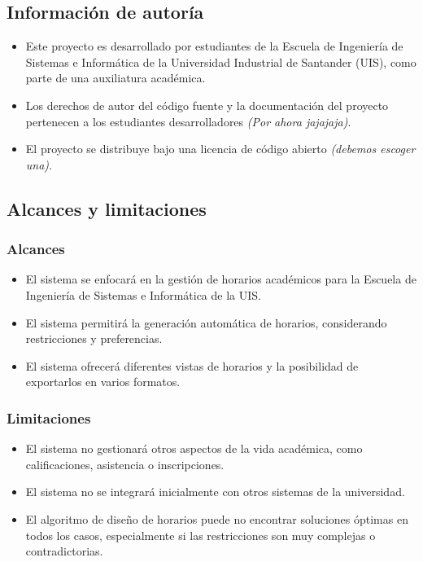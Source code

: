 \documentclass[12pt]{article} %
\begin{document}
\subsection{Información de autoría}
\begin{itemize}
    \item Este proyecto es desarrollado por estudiantes de la Escuela de Ingeniería de Sistemas e Informática de la Universidad Industrial de Santander (UIS), como parte de una auxiliatura académica.
    \item Los derechos de autor del código fuente y la documentación del proyecto pertenecen a los estudiantes desarrolladores \textit{(Por ahora jajajaja)}.
    \item El proyecto se distribuye bajo una licencia de código abierto \textit{(debemos escoger una)}.
\end{itemize}

\subsection{Alcances y limitaciones}
    \subsubsection{Alcances}
    \begin{itemize}
        \item El sistema se enfocará en la gestión de horarios académicos para la Escuela de Ingeniería de Sistemas e Informática de la UIS.
        \item El sistema permitirá la generación automática de horarios, considerando restricciones y preferencias.
        \item El sistema ofrecerá diferentes vistas de horarios y la posibilidad de exportarlos en varios formatos.
    \end{itemize}
    
    \subsubsection{Limitaciones}
    \begin{itemize}
        \item El sistema no gestionará otros aspectos de la vida académica, como calificaciones, asistencia o inscripciones.
        \item El sistema no se integrará inicialmente con otros sistemas de la universidad.
        \item El algoritmo de diseño de horarios puede no encontrar soluciones óptimas en todos los casos, especialmente si las restricciones son muy complejas o contradictorias.
    \end{itemize}
\end{document}
